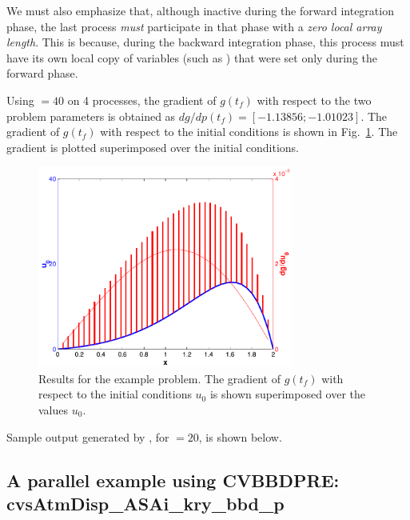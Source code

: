 We must also emphasize that, although inactive during the forward integration phase, 
the last process {\em must} participate in that phase with a 
{\em zero local array length}. 
This is because, during the backward integration phase, this process must
have its own local copy of variables (such as ) that were set
only during the forward phase.

Using  $=40$ on 4 processes, the gradient of $g(t_f)$ with respect to 
the two problem parameters is obtained as $dg/dp(t_f) = [ -1.13856; -1.01023]$.
The gradient of $g(t_f)$ with respect to the initial conditions is shown in
Fig.~\ref{f:cvsAdvDiff_ASAp_non_p}. The gradient is plotted superimposed over the
initial conditions.
\begin{figure}
  {\centerline{\includegraphics[width=0.75\textwidth]{cvsadjnonx_p}}}
  \caption{Results for the  example problem.
    The gradient of $g(t_f)$ with respect to the initial conditions $u_0$ 
    is shown superimposed over the values $u_0$.}
  \label{f:cvsAdvDiff_ASAp_non_p}
\end{figure}
Sample output generated by , for  $=20$, is
shown below.




\subsection{A parallel example using CVBBDPRE: cvsAtmDisp\_ASAi\_kry\_bbd\_p}
\label{ss:cvsAtmDisp_ASAi_kry_bbd_p}

